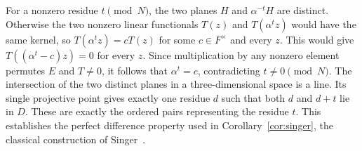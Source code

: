 \documentclass[11pt,a4paper]{article}
\begin{document}
For a nonzero residue $t\pmod N$, the two planes
$H$ and $\alpha^{-t}H$ are distinct. Otherwise the two nonzero linear
functionals $T(z)$ and $T(\alpha^t z)$ would have the same kernel,
so $T(\alpha^t z)=cT(z)$ for some $c\in F^\times$ and every $z$.
This would give $T((\alpha^t-c)z)=0$ for every $z$.
Since multiplication by any nonzero element permutes $E$ and $T\ne0$,
it follows that $\alpha^t=c$, contradicting $t\ne0\pmod N$.
The intersection of the two distinct planes in a three-dimensional
space is a line. Its single projective point gives exactly one residue
$d$ such that both $d$ and $d+t$ lie in $D$.
These are exactly the ordered pairs representing the residue $t$.
This establishes the perfect difference property used in
Corollary~\ref{cor:singer}, the classical construction of Singer~\cite{singer}.

\begingroup\raggedright
\end{document}
